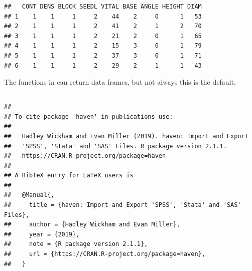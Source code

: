 \documentclass[krantz2]{krantz}\usepackage{knitr}%
\begin{document}
\begin{knitrout}\footnotesize
{}\color{fgcolor}\begin{kframe}
\begin{alltt}
 \hlkwb{<-} \hlstd{(} \hlstd{=} \hlstd{)}
\end{alltt}
\begin{verbatim}
##   CONT DENS BLOCK SEEDL VITAL BASE ANGLE HEIGHT DIAM
## 1    1    1     1     2    44    2     0      1   53
## 2    1    1     1     2    41    2     1      2   70
## 3    1    1     1     2    21    2     0      1   65
## 4    1    1     1     2    15    3     0      1   79
## 5    1    1     1     2    37    3     0      1   71
## 6    1    1     1     2    29    2     1      1   43
\end{verbatim}
\end{kframe}
\end{knitrout}

The functions in  can return data frames, but not always this is the default.

\subsection[haven]{}

\begin{knitrout}\footnotesize
{}\color{fgcolor}\begin{kframe}
\begin{alltt}
\hlstd{(} \hlstd{=} \hlstd{)}
\end{alltt}
\begin{verbatim}
## 
## To cite package 'haven' in publications use:
## 
##   Hadley Wickham and Evan Miller (2019). haven: Import and Export
##   'SPSS', 'Stata' and 'SAS' Files. R package version 2.1.1.
##   https://CRAN.R-project.org/package=haven
## 
## A BibTeX entry for LaTeX users is
## 
##   @Manual{,
##     title = {haven: Import and Export 'SPSS', 'Stata' and 'SAS' Files},
##     author = {Hadley Wickham and Evan Miller},
##     year = {2019},
##     note = {R package version 2.1.1},
##     url = {https://CRAN.R-project.org/package=haven},
##   }
\end{verbatim}
\end{kframe}
\end{knitrout}
\end{document}
